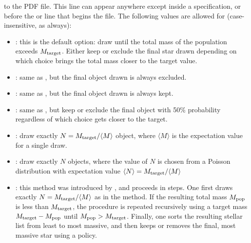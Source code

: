 \documentclass[letterpaper,10pt,english]{sphinxmanual}
\begin{document}
to the PDF file. This line can appear anywhere except inside a  specification, or before the  or  line that begins the file. The following values are allowed for  (case-insensitive, as always):
\begin{itemize}
\item {} 
: this is the default option: draw until the total mass of the population exceeds \(M_{\rm target}\). Either keep or exclude the final star drawn depending on which choice brings the total mass closer to the target value.

\item {} 
: same as , but the final object drawn is always excluded.

\item {} 
: same as , but the final object drawn is always kept.

\item {} 
: same as , but keep or exclude the final object with 50\% probability regardless of which choice gets closer to the target.

\item {} 
: draw exactly \(N = M_{\rm target}/\langle M\rangle\) object, where \(\langle M\rangle\) is the expectation value for a single draw.

\item {} 
: draw exactly \(N\) objects, where the value of \(N\) is chosen from a Poisson distribution with expectation value \(\langle N \rangle = M_{\rm target}/\langle M\rangle\)

\item {} 
: this method was introduced by , and proceeds in steps. One first draws exactly \(N= M_{\rm target}/\langle M\rangle\) as in the  method. If the resulting total mass \(M_{\rm pop}\) is less than \(M_{\rm target}\), the procedure is repeated recursively using a target mass \(M_{\rm target} - M_{\rm pop}\) until \(M_{\rm pop} > M_{\rm target}\). Finally, one sorts the resulting stellar list from least to most massive, and then keeps or removes the final, most massive star using a  policy.

\end{itemize}
\end{document}
